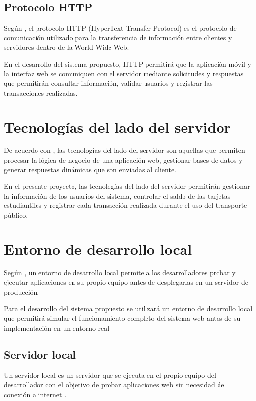 \documentclass[12pt,letterpaper]{report}
\begin{document}
	\subsection{Protocolo HTTP}
	
	Según \citet{kurose2017}, el protocolo HTTP (HyperText Transfer Protocol) es el protocolo de comunicación utilizado para la transferencia de información entre clientes y servidores dentro de la World Wide Web.
	
	En el desarrollo del sistema propuesto, HTTP permitirá que la aplicación móvil y la interfaz web se comuniquen con el servidor mediante solicitudes y respuestas que permitirán consultar información, validar usuarios y registrar las transacciones realizadas.
	
	\section{Tecnologías del lado del servidor}
	
	De acuerdo con \citet{pressman2014}, las tecnologías del lado del servidor son aquellas que permiten procesar la lógica de negocio de una aplicación web, gestionar bases de datos y generar respuestas dinámicas que son enviadas al cliente.
	
	En el presente proyecto, las tecnologías del lado del servidor permitirán gestionar la información de los usuarios del sistema, controlar el saldo de las tarjetas estudiantiles y registrar cada transacción realizada durante el uso del transporte público.
	
	\section{Entorno de desarrollo local}
	
	Según \citet{pressman2014}, un entorno de desarrollo local permite a los desarrolladores probar y ejecutar aplicaciones en su propio equipo antes de desplegarlas en un servidor de producción.
	
	Para el desarrollo del sistema propuesto se utilizará un entorno de desarrollo local que permitirá simular el funcionamiento completo del sistema web antes de su implementación en un entorno real.
	
	\subsection{Servidor local}
	
	Un servidor local es un servidor que se ejecuta en el propio equipo del desarrollador con el objetivo de probar aplicaciones web sin necesidad de conexión a internet \citep{tanenbaum2016}.
	
\end{document}
